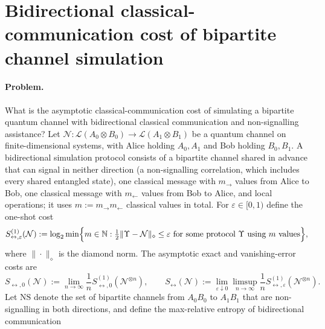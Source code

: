 \section{Bidirectional classical-communication cost of bipartite channel simulation}
\label{sec:op_6006e574028a48fd}

\paragraph{Problem.}
What is the asymptotic classical-communication cost of simulating a
bipartite quantum channel with bidirectional classical communication and
non-signalling assistance?  Let
$\mathcal N:\mathcal L(A_0\otimes B_0)\to\mathcal L(A_1\otimes B_1)$ be a
quantum channel on finite-dimensional systems, with Alice holding $A_0,A_1$
and Bob holding $B_0,B_1$.  A bidirectional simulation protocol consists of
a bipartite channel shared in advance that can signal in neither direction
(a non-signalling correlation, which includes every shared entangled
state), one classical message with $m_\to$ values from Alice to Bob, one
classical message with $m_\leftarrow$ values from Bob to Alice, and local
operations; it uses $m:=m_\to m_\leftarrow$ classical values in total.  For
$\varepsilon\in[0,1)$ define the one-shot cost
\begin{equation}
  S^{(1)}_{\leftrightarrow,\varepsilon}(\mathcal N)
  :=\log_2\min\Bigl\{m\in\mathbb N:
    \tfrac12\|\Upsilon-\mathcal N\|_\diamond\leq\varepsilon
    \text{ for some protocol }\Upsilon\text{ using }m\text{ values}\Bigr\},
  \label{eq:6006-one-shot-cost}
\end{equation}
where $\|\cdot\|_\diamond$ is the diamond norm.  The asymptotic exact and
vanishing-error costs are
\begin{equation}
  S_{\leftrightarrow,0}(\mathcal N)
  :=\lim_{n\to\infty}\frac1n
    S^{(1)}_{\leftrightarrow,0}(\mathcal N^{\otimes n}),
  \qquad
  S_{\leftrightarrow}(\mathcal N)
  :=\lim_{\varepsilon\downarrow0}\limsup_{n\to\infty}
    \frac1n S^{(1)}_{\leftrightarrow,\varepsilon}(\mathcal N^{\otimes n}).
  \label{eq:6006-asymptotic-cost}
\end{equation}
Let $\mathrm{NS}$ denote the set of bipartite channels from $A_0B_0$ to
$A_1B_1$ that are non-signalling in both directions, and define the
max-relative entropy of bidirectional communication
